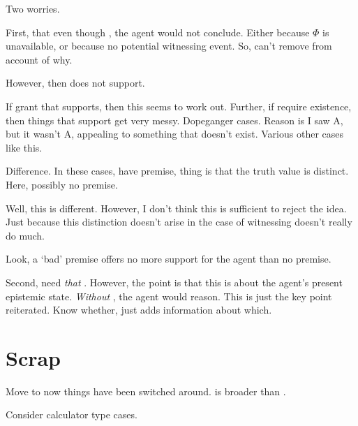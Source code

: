 \begin{note}
  Two worries.

  First, that even though , the agent would not conclude.
  Either because \(\Phi\) is unavailable, or because no potential witnessing event.
  So, can't remove  from account of why.

  However, then  does not support.

  If grant that  supports, then this seems to work out.
  Further, if require existence, then things that support get very messy.
  Dopeganger cases.
  Reason is I saw A, but it wasn't A, appealing to something that doesn't exist.
  Various other cases like this.

  Difference.
  In these cases, have premise, thing is that the truth value is distinct.
  Here, possibly no premise.

  Well, this is different.
  However, I don't think this is sufficient to reject the idea.
  Just because this distinction doesn't arise in the case of witnessing doesn't really do much.

  Look, a `bad' premise offers no more support for the agent than no premise.

  Second, need \emph{that} .
  However, the point is that this is about the agent's present epistemic state.
  \emph{Without} , the agent would reason.
  This is just the key point reiterated.
  Know whether,  just adds information about which.
\end{note}

\section{Scrap}

\begin{note}
  {
    \color{red}
    Move to \requ{} now things have been switched around.
  }
  \fc{} is broader than \requ{}.

  Consider calculator type cases.
\end{note}


